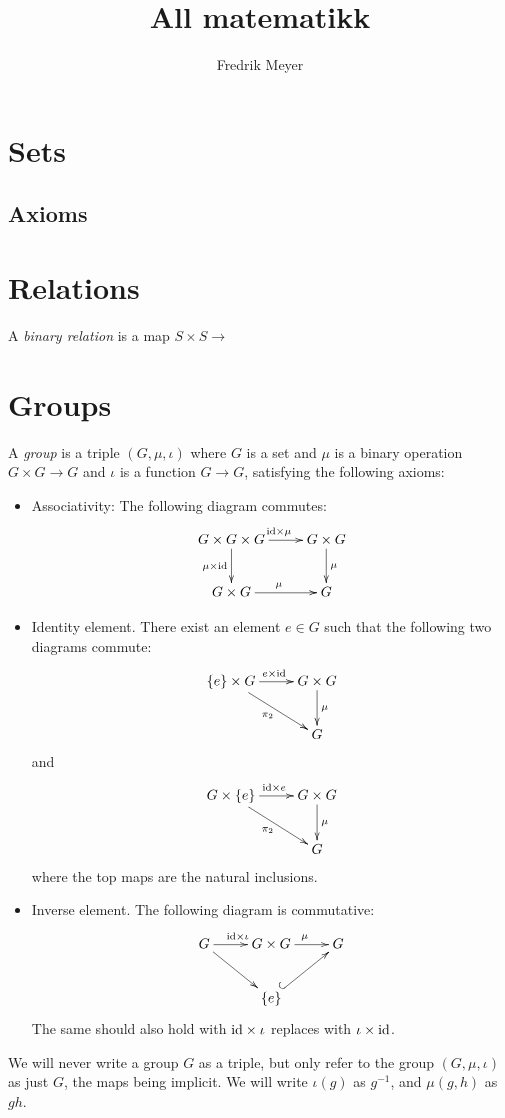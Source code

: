 \documentclass[11pt, norsk]{book}
\begin{document}
\title{All matematikk}
\author{Fredrik Meyer}
\maketitle 

\chapter{Sets}
\section{Axioms}

\chapter{Relations}

\begin{defi}
A  \emph{binary relation} is a map $S \times S \to $
\end{defi}

\chapter{Groups}

\begin{defi}
A \emph{group} is a triple $(G,\mu,\iota)$ where $G$ is a set and $\mu$ is a binary operation $G \times G \to G$ and $\iota$ is a function $G \to G$, satisfying the following axioms:
\begin{itemize}
\item Associativity: The following diagram commutes:
\[
\xymatrix{
G \times G \times G \ar[r]^{\id \times \mu} \ar[d]_{\mu \times \id} & G \times G \ar[d]^\mu \\
G \times G \ar[r]^\mu & G
}
\]
\item Identity element. There exist an element $e \in G$ such that the following two diagrams commute:
\[
\xymatrix{
\{ e \} \times G \ar[r]^{e \times \id} \ar[dr]_{\pi_2} & G \times G \ar[d]^{\mu} \\
& G 
}
\]
and
\[
\xymatrix{
G \times \{e \} \ar[r]^{\id \times e} \ar[dr]_{\pi_2} & G \times G \ar[d]^{\mu} \\
& G 
}
\]
where the top maps are the natural inclusions.
\item Inverse element. The following diagram is commutative:
\[
\xymatrix{
G \ar[r]^{\id \times \iota} \ar[dr] & G \times G \ar[r]^\mu & G \\
& \{e \} \ar@{^(->}[ur]
}
\]
The same should also hold with $\text{id} \times \iota$ replaces with $\iota \times \text{id}$.
\end{itemize}
\end{defi}
We will never write a group $G$ as a triple, but only refer to the group $(G,\mu,\iota)$ as just $G$, the maps being implicit. We will write $\iota(g)$ as $g^{-1}$, and $\mu(g,h)$ as $gh$.
\end{document}
